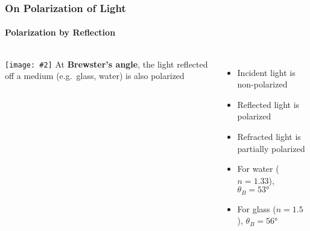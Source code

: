 \documentclass[compress,aspectratio=169]{beamer}
\newcommand{\pic}[2]{\texttt{[image: \#2]}}
\newcommand{\eq}[2]{\vspace{#1}{\LARGE\begin{displaymath}#2\end{displaymath}}}
\begin{document}
\begin{frame}
  \frametitle{On Polarization of Light}
  \framesubtitle{Polarization by Reflection}
  \begin{columns}
    \pic{1}{graphics/01fig16.jpg}
    At \textbf{Brewster's angle}, the light reflected off a medium (e.g.\
    glass, water) is also polarized

    \eq{-.1in}{
      \theta_B =\tan^{-1}\left(\frac{n_2}{n_1}\right)
    }
    \begin{itemize}
    \item Incident light is non-polarized
    \item Reflected light is polarized
    \item Refracted light is partially polarized
    \item For water ($n=1.33$), $\theta_B=\ang{53}$
    \item For glass ($n=1.5$), $\theta_B=\ang{56}$
    \end{itemize}
  \end{columns}
\end{frame}
\end{document}
